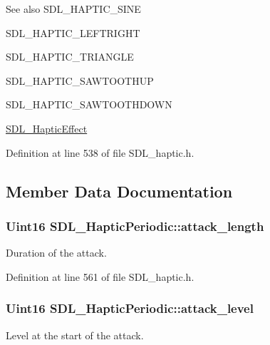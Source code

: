 \begin{DoxySeeAlso}{See also}
S\+D\+L\+\_\+\+H\+A\+P\+T\+I\+C\+\_\+\+S\+I\+N\+E 

S\+D\+L\+\_\+\+H\+A\+P\+T\+I\+C\+\_\+\+L\+E\+F\+T\+R\+I\+G\+H\+T 

S\+D\+L\+\_\+\+H\+A\+P\+T\+I\+C\+\_\+\+T\+R\+I\+A\+N\+G\+L\+E 

S\+D\+L\+\_\+\+H\+A\+P\+T\+I\+C\+\_\+\+S\+A\+W\+T\+O\+O\+T\+H\+U\+P 

S\+D\+L\+\_\+\+H\+A\+P\+T\+I\+C\+\_\+\+S\+A\+W\+T\+O\+O\+T\+H\+D\+O\+W\+N 

\hyperlink{unionSDL__HapticEffect}{S\+D\+L\+\_\+\+Haptic\+Effect} 
\end{DoxySeeAlso}


Definition at line 538 of file S\+D\+L\+\_\+haptic.\+h.



\subsection{Member Data Documentation}
\hypertarget{structSDL__HapticPeriodic_ab35eedce7107edc75640586159fe75bb}{
\subsubsection[{attack\+\_\+length}]{\setlength{\rightskip}{0pt plus 5cm}Uint16 S\+D\+L\+\_\+\+Haptic\+Periodic\+::attack\+\_\+length}}\label{structSDL__HapticPeriodic_ab35eedce7107edc75640586159fe75bb}
Duration of the attack. 

Definition at line 561 of file S\+D\+L\+\_\+haptic.\+h.

\hypertarget{structSDL__HapticPeriodic_a79fc2217fea6db6ab3d89ad905d52ccb}{
\subsubsection[{attack\+\_\+level}]{\setlength{\rightskip}{0pt plus 5cm}Uint16 S\+D\+L\+\_\+\+Haptic\+Periodic\+::attack\+\_\+level}}\label{structSDL__HapticPeriodic_a79fc2217fea6db6ab3d89ad905d52ccb}
Level at the start of the attack. 


